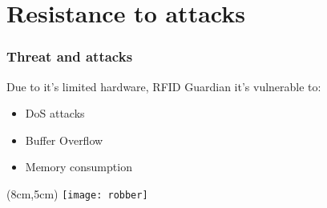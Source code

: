 \section{Resistance to attacks}
\begin{frame}
\frametitle{Threat and attacks}
 Due to it's limited hardware, RFID Guardian it's vulnerable to:
 \begin{itemize}
  \item DoS attacks
  \item Buffer Overflow
  \item Memory consumption
 \end{itemize}

  \begin{textblock*}{5cm}(8cm,5cm)
  \texttt{[image: robber]}
 \end{textblock*}

\end{frame}
